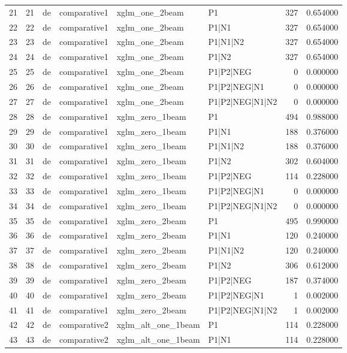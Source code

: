 \begin{tabular}{lrllllrr}
21 & 21 & de & comparative1 & xglm_one_2beam & P1 & 327 & 0.654000 \\
22 & 22 & de & comparative1 & xglm_one_2beam & P1|N1 & 327 & 0.654000 \\
23 & 23 & de & comparative1 & xglm_one_2beam & P1|N1|N2 & 327 & 0.654000 \\
24 & 24 & de & comparative1 & xglm_one_2beam & P1|N2 & 327 & 0.654000 \\
25 & 25 & de & comparative1 & xglm_one_2beam & P1|P2|NEG & 0 & 0.000000 \\
26 & 26 & de & comparative1 & xglm_one_2beam & P1|P2|NEG|N1 & 0 & 0.000000 \\
27 & 27 & de & comparative1 & xglm_one_2beam & P1|P2|NEG|N1|N2 & 0 & 0.000000 \\
28 & 28 & de & comparative1 & xglm_zero_1beam & P1 & 494 & 0.988000 \\
29 & 29 & de & comparative1 & xglm_zero_1beam & P1|N1 & 188 & 0.376000 \\
30 & 30 & de & comparative1 & xglm_zero_1beam & P1|N1|N2 & 188 & 0.376000 \\
31 & 31 & de & comparative1 & xglm_zero_1beam & P1|N2 & 302 & 0.604000 \\
32 & 32 & de & comparative1 & xglm_zero_1beam & P1|P2|NEG & 114 & 0.228000 \\
33 & 33 & de & comparative1 & xglm_zero_1beam & P1|P2|NEG|N1 & 0 & 0.000000 \\
34 & 34 & de & comparative1 & xglm_zero_1beam & P1|P2|NEG|N1|N2 & 0 & 0.000000 \\
35 & 35 & de & comparative1 & xglm_zero_2beam & P1 & 495 & 0.990000 \\
36 & 36 & de & comparative1 & xglm_zero_2beam & P1|N1 & 120 & 0.240000 \\
37 & 37 & de & comparative1 & xglm_zero_2beam & P1|N1|N2 & 120 & 0.240000 \\
38 & 38 & de & comparative1 & xglm_zero_2beam & P1|N2 & 306 & 0.612000 \\
39 & 39 & de & comparative1 & xglm_zero_2beam & P1|P2|NEG & 187 & 0.374000 \\
40 & 40 & de & comparative1 & xglm_zero_2beam & P1|P2|NEG|N1 & 1 & 0.002000 \\
41 & 41 & de & comparative1 & xglm_zero_2beam & P1|P2|NEG|N1|N2 & 1 & 0.002000 \\
42 & 42 & de & comparative2 & xglm_alt_one_1beam & P1 & 114 & 0.228000 \\
43 & 43 & de & comparative2 & xglm_alt_one_1beam & P1|N1 & 114 & 0.228000 \\

\end{tabular}
